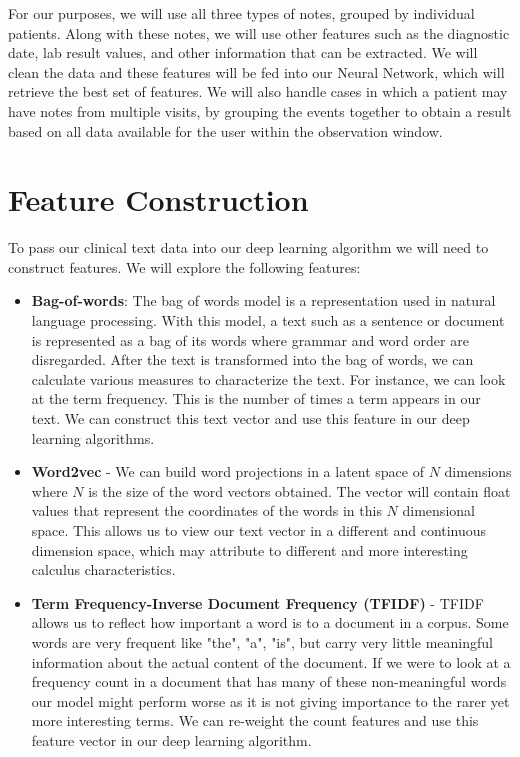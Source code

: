 \documentclass{article}
\begin{document}
\noindent For our purposes, we will use all three types of notes, grouped by individual patients. Along with these notes, we will use other features such as the diagnostic date, lab result values, and other information that can be extracted. We will clean the data and these features will be fed into our Neural Network, which will retrieve the best set of features. We will also handle cases in which a patient may have notes from multiple visits, by grouping the events together to obtain a result based on all data available for the user within the observation window.
\section{Feature Construction}
To pass our clinical text data into our deep learning algorithm we will need to construct features. We will explore the following features: 
\begin{itemize}
\item \textbf{Bag-of-words}:  The bag of words model is a representation used in natural language processing. With this model, a text such as a sentence or document is represented as a bag of its words where grammar and word order are disregarded. After the text is transformed into the bag of words, we can calculate various measures to characterize the text. For instance, we can look at the term frequency. This is the number of times a term appears in our text. We can construct this text vector and use this feature  in our deep learning algorithms.
\item \textbf{Word2vec} -  We can build  word projections in a latent space of $N$ dimensions where $N$ is the size of the word vectors obtained. The vector will contain float values that represent the coordinates of the words in this $N$ dimensional space. This allows us to view our text vector in a different and continuous dimension space, which may attribute to different and more interesting calculus characteristics. 
\item \textbf{Term Frequency-Inverse Document Frequency (TFIDF)} - TFIDF allows us to reflect how important a word is to a document in a corpus. Some words are very frequent like "the", "a", "is", but carry very little meaningful information about the actual content of the document. If we were to look at a frequency count in a document that has many of these non-meaningful words our model might perform worse as it is not giving importance to the rarer yet more interesting terms.  We can re-weight the count features and use this feature vector in our deep learning algorithm. 
\end{itemize}
\end{document}
